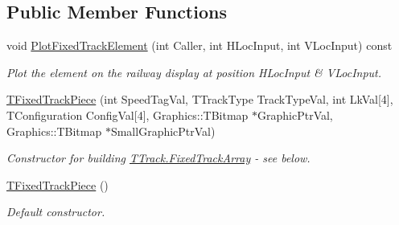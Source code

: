 \subsection*{Public Member Functions}
\begin{DoxyCompactItemize}
\item 
\mbox{\label{class_t_fixed_track_piece_a13eca615770d45f35bb808eaa264fda9}} 
void \mbox{\hyperlink{class_t_fixed_track_piece_a13eca615770d45f35bb808eaa264fda9}{Plot\+Fixed\+Track\+Element}} (int Caller, int H\+Loc\+Input, int V\+Loc\+Input) const
\begin{DoxyCompactList}\small\item\em Plot the element on the railway display at position H\+Loc\+Input \& V\+Loc\+Input. \end{DoxyCompactList}\item 
\mbox{\label{class_t_fixed_track_piece_af9d54643faf473becbc953a11eacab51}} 
\mbox{\hyperlink{class_t_fixed_track_piece_af9d54643faf473becbc953a11eacab51}{T\+Fixed\+Track\+Piece}} (int Speed\+Tag\+Val, T\+Track\+Type Track\+Type\+Val, int Lk\+Val\mbox{[}4\mbox{]}, T\+Configuration Config\+Val\mbox{[}4\mbox{]}, Graphics\+::\+T\+Bitmap $\ast$Graphic\+Ptr\+Val, Graphics\+::\+T\+Bitmap $\ast$Small\+Graphic\+Ptr\+Val)
\begin{DoxyCompactList}\small\item\em Constructor for building \mbox{\hyperlink{class_t_track_aa518e921b7809730b4b43e96f7136817}{T\+Track.\+Fixed\+Track\+Array}} -\/ see below. \end{DoxyCompactList}\item 
\mbox{\label{class_t_fixed_track_piece_a5b7733fb7da20c74bd811743d70cd535}} 
\mbox{\hyperlink{class_t_fixed_track_piece_a5b7733fb7da20c74bd811743d70cd535}{T\+Fixed\+Track\+Piece}} ()
\begin{DoxyCompactList}\small\item\em Default constructor. \end{DoxyCompactList}\end{DoxyCompactItemize}
